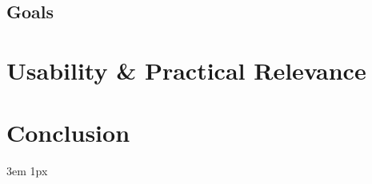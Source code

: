 \documentclass{Academic}
\begin{document}
    \subsection{Goals}


    \section{Usability \& Practical Relevance}


    \section{Conclusion}

    \singlespacing
    \emergencystretch 3em
    \hfuzz 1px
    \printbibliography[heading=bibnumbered]




\end{document}
